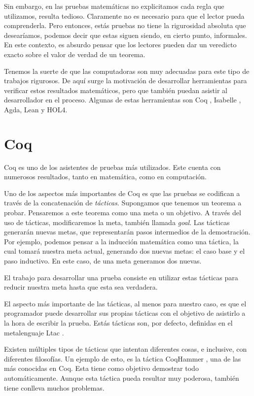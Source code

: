 Sin embargo, en las pruebas matemáticas no explicitamos cada regla que utilizamos, resulta tedioso.
Claramente no es necesario para que el lector pueda comprenderla.
Pero entonces, estás pruebas no tiene la rigurosidad absoluta que desearíamos, podemos decir que estas siguen siendo, en cierto punto, informales.
En este contexto, es absurdo pensar que los lectores pueden dar un veredicto exacto sobre el valor de verdad de un teorema.

Tenemos la suerte de que las computadoras son muy adecuadas para este tipo de trabajos rigurosos. De aquí surge la motivación de desarrollar herramientas para verificar estos resultados matemáticos, pero que también puedan asistir al desarrollador en el proceso. Algunas de estas herramientas son Coq \cite{CIC}, Isabelle \cite{DBLP:books/sp/NipkowPW02}, Agda, Lean y HOL4.

\section{Coq}

Coq es uno de los asistentes de pruebas más utilizados.
Este cuenta con numerosos resultados, tanto en matemática, como en computación.

Uno de los aspectos más importantes de Coq es que las pruebas se codifican a través de la concatenación de \emph{tácticas}.
Supongamos que tenemos un teorema a probar.
Pensaremos a este teorema como una meta o un objetivo.
A través del uso de tácticas, modificaremos la meta, también llamada \emph{goal}.
Las tácticas generarán nuevas metas, que representarán pasos intermedios de la demostración.
Por ejemplo, podemos pensar a la inducción matemática como una táctica, la cual tomará nuestra meta actual, generando dos nuevas metas: el caso base y el paso inductivo. En este caso, de una meta generamos dos nuevas.

El trabajo para desarrollar una prueba consiste en utilizar estas tácticas para reducir nuestra meta hasta que esta sea verdadera.

El aspecto más importante de las tácticas, al menos para nuestro caso, es que el programador puede desarrollar sus propias tácticas con el objetivo de asistirlo a la hora de escribir la prueba.
Estás tácticas son, por defecto, definidas en el metalenguaje Ltac \cite{DBLP:conf/lpar/Delahaye00}.

Existen múltiples tipos de tácticas que intentan diferentes cosas, e inclusive, con diferentes filosofías.
Un ejemplo de esto, es la táctica CoqHammer \cite{DBLP:journals/jar/CzajkaK18}, una de las más conocidas en Coq. Esta tiene como objetivo demostrar todo automáticamente.
Aunque esta táctica pueda resultar muy poderosa, también tiene conlleva muchos problemas.

